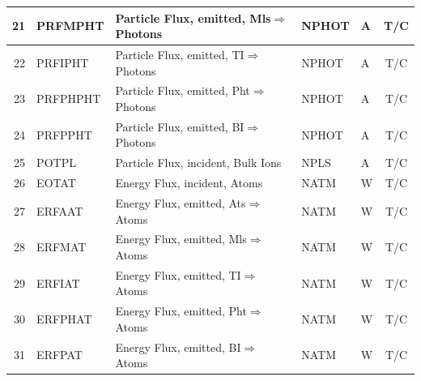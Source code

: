 \begin{landscape}
\begin{longtable}{|r|l|l|l|l|c|}
    \hline
    21                       & PRFMPHT                & Particle Flux, emitted,
    \ac{Mls}$\Rightarrow$Photons     & NPHOT                  & \si{\ampere}                  & T/C
    \\
    \hline
    22                       & PRFIPHT                & Particle Flux, emitted,
    \ac{TI}$\Rightarrow$Photons     & NPHOT                  & \si{\ampere}                  & T/C
    \\
    \hline
    23                       & PRFPHPHT               & Particle Flux, emitted,
    \ac{Pht}$\Rightarrow$Photons     & NPHOT                  & \si{\ampere}                  & T/C
    \\
    \hline
    24                       & PRFPPHT                & Particle Flux, emitted,
    \ac{BI}$\Rightarrow$Photons     & NPHOT                  & \si{\ampere}                  & T/C
    \\
    \hline
    25                       & POTPL                  & Particle Flux, incident,
    Bulk Ions                & NPLS
                             & \si{\ampere}           & T/C
    \\
    \hline
    26                       & EOTAT                  & Energy Flux, incident,
    Atoms                    & NATM
                             & \si{\watt}             & T/C
    \\   \hline
    27                       & ERFAAT                 & Energy Flux, emitted,
    \ac{Ats}$\Rightarrow$Atoms       & NATM                   & \si{\watt}                    & T/C
    \\
    \hline
    28                       & ERFMAT                 & Energy Flux, emitted,
    \ac{Mls}$\Rightarrow$Atoms       & NATM                   & \si{\watt}                    & T/C
    \\
    \hline
    29                       & ERFIAT                 & Energy Flux, emitted,
    \ac{TI}$\Rightarrow$Atoms       & NATM                   & \si{\watt}                    & T/C
    \\
    \hline
    30                       & ERFPHAT                & Energy Flux, emitted,
    \ac{Pht}$\Rightarrow$Atoms       & NATM                   & \si{\watt}                    & T/C
    \\
    \hline
    31                       & ERFPAT                 & Energy Flux, emitted,
    \ac{BI}$\Rightarrow$Atoms       & NATM                   & \si{\watt}                    & T/C
    \\
    \hline

\end{longtable}
\end{landscape}
